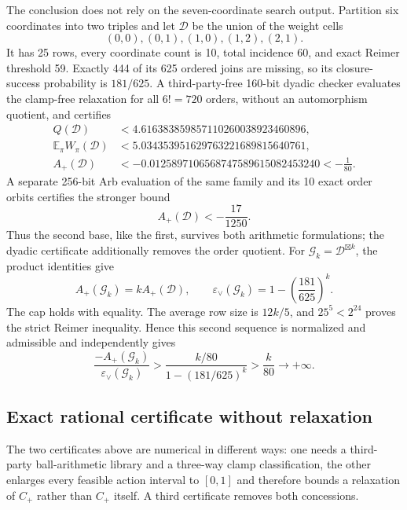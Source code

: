 \documentclass[11pt]{article}
\theoremstyle{remark}
\newcommand{\eps}{\varepsilon}
\newcommand{\boxprod}{\mathbin{\boxtimes}}
\begin{document}
The conclusion does not rely on the seven-coordinate search output.  Partition
six coordinates into two triples and let $\mathcal D$ be the union of the weight cells
\[
 (0,0),(0,1),(1,0),(1,2),(2,1).
\]
It has 25 rows, every coordinate count is 10, total incidence 60, and exact
Reimer threshold 59.  Exactly 444 of its 625 ordered joins are missing, so its
closure-success probability is $181/625$.  A third-party-free 160-bit dyadic
checker evaluates the clamp-free relaxation for all $6!=720$ orders, without
an automorphism quotient, and certifies
\[
\begin{aligned}
 Q(\mathcal D)&<4.616383859857110260038923460896,\\
 \mathbb E_\pi W_\pi(\mathcal D)&<5.034353951629763221689815640761,\\
 A_+(\mathcal D)&<-0.0125897106568747589615082453240<-\frac1{80}.
\end{aligned}
\]
A separate 256-bit Arb evaluation of the same family and its 10 exact order
orbits certifies the stronger bound
\[
 A_+(\mathcal D)<-\frac{17}{1250}.
\]
Thus the second base, like the first, survives both arithmetic formulations;
the dyadic certificate additionally removes the order quotient.
For $\mathcal G_k=\mathcal D^{\boxprod k}$, the product identities give
\[
 A_+(\mathcal G_k)=kA_+(\mathcal D),\qquad
 \eps_\vee(\mathcal G_k)=1-\left(\frac{181}{625}\right)^k.
\]
The cap holds with equality.  The average row size is $12k/5$, and
$25^5<2^{24}$ proves the strict Reimer inequality.  Hence this second sequence
is normalized and admissible and independently gives
\[
 \frac{-A_+(\mathcal G_k)}{\eps_\vee(\mathcal G_k)}
 >\frac{k/80}{1-(181/625)^k}>\frac{k}{80}\longrightarrow+\infty.
\]

\subsection{Exact rational certificate without relaxation}

The two certificates above are numerical in different ways: one needs a
third-party ball-arithmetic library and a three-way clamp classification, the
other enlarges every feasible action interval to $[0,1]$ and therefore bounds a
relaxation of $C_+$ rather than $C_+$ itself.  A third certificate removes both
concessions.
\end{document}
